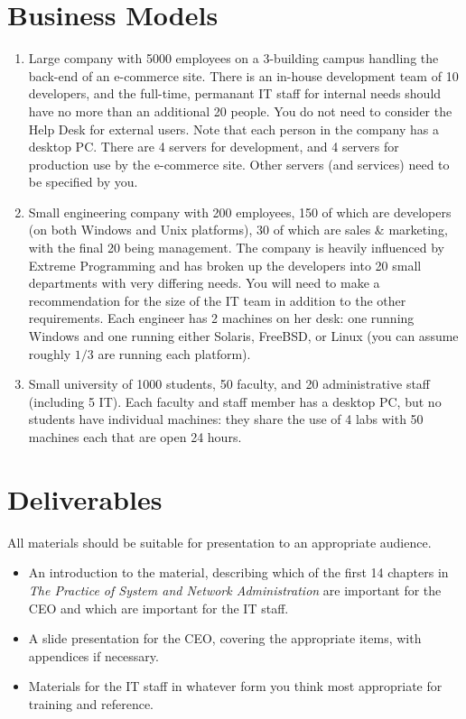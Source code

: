 \documentclass{exam}
\begin{document}
\begin{questions}
\section*{Business Models}

\begin{enumerate}
\item Large company with 5000 employees on a 3-building campus handling 
  the back-end of an
  e-commerce site.  There is an in-house development team of 10 developers,
  and the full-time, permanant IT staff for internal needs should have no 
  more than an additional 20 people.  You do not need to consider
  the Help Desk for external users.  Note that each person in the
  company has a desktop PC.  There are 4 servers for development, and
  4 servers for production use by the e-commerce site.  
  Other servers (and services) need to  be specified by you.
\item Small engineering company with 200 employees, 150 of which are
  developers (on both Windows and Unix platforms), 30 of which are 
  sales \& marketing, with the final
  20 being management.  The company is heavily influenced by Extreme
  Programming and has broken up the developers into 20 small 
  departments with very differing needs.  You will need to make a 
  recommendation for the
  size of the IT team in addition to the other requirements.  Each
  engineer has 2 machines on her desk: one running Windows and one
  running either Solaris, FreeBSD, or Linux (you can assume roughly
  $1/3$ are running each platform).  
\item Small university of 1000 students, 50 faculty, and 
  20 administrative staff (including 5 IT).  Each faculty and staff
  member has a desktop PC, but no students have individual machines: they
  share the use of 4 labs with 50 machines each that are open 24 hours.
  
\end{enumerate}

\section*{Deliverables}

All materials should be suitable for presentation to an appropriate audience.

\begin{itemize}
\item An introduction to the material, describing which  of the first
  14 chapters in
  \emph{The Practice of System and Network Administration} are important
  for the CEO and which are important for the IT staff.
\item A slide presentation for the CEO, covering the appropriate items, 
  with appendices if necessary.
\item Materials for the IT staff in whatever form you think most 
  appropriate for training and reference.
\end{itemize}


\end{questions}
\end{document}
